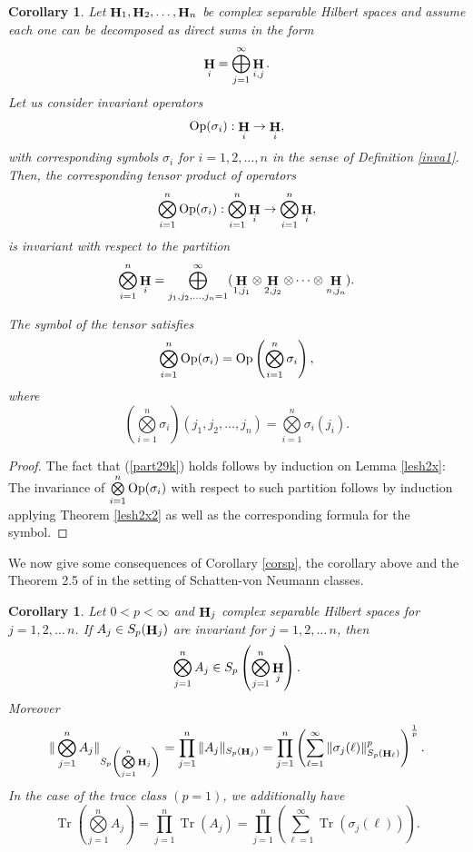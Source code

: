 \documentclass[a4paper,12pt,reqno]{amsart}
\renewcommand\eqref[1]{(\ref{#1})} %
\newtheorem{cor}[thm]{Corollary}
\theoremstyle{definition}
\theoremstyle{remark}
\numberwithin{equation}{section}
\def\Op{{{\rm Op}}}
\DeclareMathOperator{\Tr}{Tr}
\def\Op{\text{\rm Op}}
\DeclareMathOperator{\Hi}{{\bf H}}
\begin{document}
\begin{cor} \label{cortenx}  Let $\Hi_1, \Hi_2,\dots, \Hi_n$  be    complex separable Hilbert spaces 
 and assume each one can be decomposed as direct sums in the form
\[\Hi_i=\bigoplus\limits_{j=1}^{\infty}\Hi_{i,j}. \]
Let us consider invariant operators 
\[\Op(\sigma_i):\Hi_i\rightarrow\Hi_i, \]
with corresponding  symbols $\sigma_i$ for $i=1,2,\dots, n$ in the sense of Definition \ref{inva1}. Then, the corresponding tensor product of operators 
\[\bigotimes\limits_{i=1}^{n} \Op(\sigma_i):\bigotimes\limits_{i=1}^{n}\Hi_i\rightarrow \bigotimes\limits_{i=1}^{n}\Hi_i,\] is invariant with respect to the partition
\begin{equation}\label{part29k}
\bigotimes\limits_{i=1}^{n}\Hi_i= \bigoplus\limits_{j_1,j_2,\dots,j_n=1}^{\infty}(\Hi_{1,j_1}\otimes\Hi_{2,j_2}\otimes\cdots\otimes \Hi_{n,j_n}).
\end{equation}

The symbol of the tensor satisfies 
\[ \bigotimes\limits_{i=1}^{n}\Op(\sigma_i)=\Op\left(\bigotimes\limits_{i=1}^{n}\sigma_i\right),\]
where
\[\left(\bigotimes\limits_{i=1}^{n}\sigma_i\right)(j_1,j_2,\dots,j_n)=\bigotimes\limits_{i=1}^{n}\sigma_i(j_i).\]
 \end{cor}
\begin{proof} The fact that \eqref{part29k} holds follows by induction on Lemma \ref{lesh2x}: The invariance of $\bigotimes\limits_{i=1}^{n} \Op(\sigma_i)$ with respect to such partition follows by induction applying Theorem \ref{lesh2x2} as well as the corresponding formula for the symbol. 
\end{proof}
We now give some consequences of Corollary \ref{corsp}, the corollary above and the Theorem  2.5 of \cite{fjdmr:foum} in the setting of Schatten-von Neumann classes.
\begin{cor} \label{invSchatten0} Let  $0<p<\infty$ and   $\Hi_j$  complex separable Hilbert spaces for $j=1, 2, \dots \, n$. If $A_j\in S_p(\Hi_j)$ are invariant  for $j=1, 2, \dots \, n$, then  
\[\bigotimes \limits_{j=1}^{n}A_j\in S_p\left(\bigotimes \limits_{j=1}^{n}\Hi_j\right).\]
Moreover
\[\|\bigotimes \limits_{j=1}^{n}A_j\|_{S_p\left(\bigotimes \limits_{j=1}^{n}\Hi_j\right)}=\prod\limits_{j=1}^{n}\|A_j\|_{S_p(\Hi_j)}=\prod\limits_{j=1}^{n}\left(\sum\limits_{\ell=1}^{\infty}\|\sigma_j(\ell)\|_{S_p(\Hi_{\ell})}^p \right)^{\frac{1}{p}}.\]
In the case of the  trace class $(p=1)$, we additionally have 
\begin{equation}
\Tr\left(\bigotimes \limits_{j=1}^n A_j\right)=\prod\limits_{j=1}^{n}\Tr(A_j)=\prod\limits_{j=1}^{n}\left(\sum\limits_{\ell=1}^{\infty}\Tr(\sigma_j(\ell) )\right).\label{trinf2h}\end{equation}	 
\end{cor}
\end{document}
